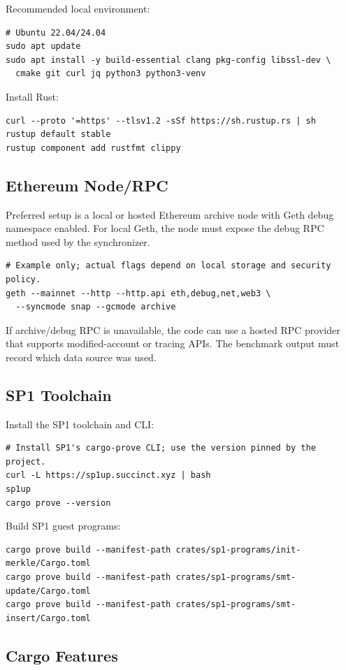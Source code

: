 \documentclass[UTF8,a4paper,11pt]{ctexart}
\begin{document}
Recommended local environment:
\begin{lstlisting}
# Ubuntu 22.04/24.04
sudo apt update
sudo apt install -y build-essential clang pkg-config libssl-dev \
  cmake git curl jq python3 python3-venv
\end{lstlisting}

Install Rust:
\begin{lstlisting}
curl --proto '=https' --tlsv1.2 -sSf https://sh.rustup.rs | sh
rustup default stable
rustup component add rustfmt clippy
\end{lstlisting}

\subsection{Ethereum Node/RPC}

Preferred setup is a local or hosted Ethereum archive node with Geth debug namespace enabled. For local Geth, the node must expose the debug RPC method used by the synchronizer.

\begin{lstlisting}
# Example only; actual flags depend on local storage and security policy.
geth --mainnet --http --http.api eth,debug,net,web3 \
  --syncmode snap --gcmode archive
\end{lstlisting}

If archive/debug RPC is unavailable, the code can use a hosted RPC provider that supports modified-account or tracing APIs. The benchmark output must record which data source was used.


\subsection{SP1 Toolchain}

Install the SP1 toolchain and CLI:
\begin{lstlisting}
# Install SP1's cargo-prove CLI; use the version pinned by the project.
curl -L https://sp1up.succinct.xyz | bash
sp1up
cargo prove --version
\end{lstlisting}

Build SP1 guest programs:
\begin{lstlisting}
cargo prove build --manifest-path crates/sp1-programs/init-merkle/Cargo.toml
cargo prove build --manifest-path crates/sp1-programs/smt-update/Cargo.toml
cargo prove build --manifest-path crates/sp1-programs/smt-insert/Cargo.toml
\end{lstlisting}

\subsection{Cargo Features}
\end{document}
